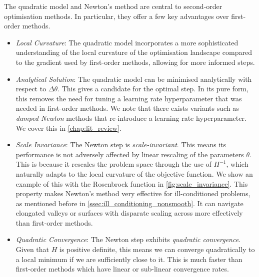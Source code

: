 The quadratic model and Newton's method are central to second-order optimisation methods. In particular, they offer a few key advantages over first-order methods. 
\begin{itemize}
    \item \textit{Local Curvature}: The quadratic model incorporates a more sophisticated understanding of the local curvature of the optimisation landscape compared to the gradient used by first-order methods, allowing for more informed steps.
    \item \textit{Analytical Solution}: The quadratic model can be minimised analytically with respect to $\Delta \theta$. This gives a candidate for the optimal step. In its pure form, this removes the need for tuning a learning rate hyperparameter that was needed in first-order methods. We note that there exists variants such as \textit{damped Newton} methods that re-introduce a learning rate hyperparameter. We cover this in \cref{chap:lit_review}.
    \item \textit{Scale Invariance}: The Newton step is \textit{scale-invariant}. This means its performance is not adversely affected by linear rescaling of the parameters $\theta$. This is because it rescales the problem space through the use of $H^{-1}$, which naturally adapts to the local curvature of the objective function. We show an example of this with the Rosenbrock function in \cref{fig:scale_invariance}.
    This property makes Newton's method very effective for ill-conditioned problems, as mentioned before in \cref{ssec:ill_conditioning_nonsmooth}. It can navigate elongated valleys or surfaces with disparate scaling across more effectively than first-order methods.
    \item \textit{Quadratic Convergence}: The Newton step exhibits \textit{quadratic convergence}. Given that $H$ is positive definite, this means we can converge quadratically to a local minimum if we are sufficiently close to it. This is much faster than first-order methods which have linear or sub-linear convergence rates.
\end{itemize}

